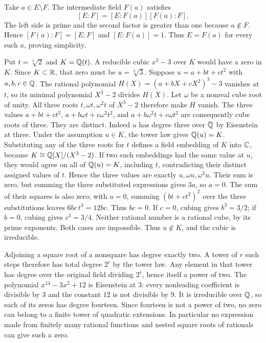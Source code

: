 Take $a\in E\setminus F$. The intermediate field $F(a)$ satisfies
\[[E:F]=[E:F(a)][F(a):F].\]
The left side is prime and the second factor is greater than one because $a\notin F$. Hence $[F(a):F]=[E:F]$ and $[E:F(a)]=1$. Thus $E=F(a)$ for every such $a$, proving simplicity.

Put $t=\sqrt[3]2$ and $K=\mathbb{Q}(t)$. A reducible cubic $x^3-3$ over $K$ would have a zero in $K$. Since $K\subset\mathbb{R}$, that zero must be $u=\sqrt[3]3$.
Suppose $u=a+bt+ct^2$ with $a,b,c\in\mathbb{Q}$. The rational polynomial $H(X)=(a+bX+cX^2)^3-3$ vanishes at $t$, so its minimal polynomial $X^3-2$ divides $H(X)$. Let $\omega$ be a nonreal cube root of unity. All three roots $t,\omega t,\omega^2t$ of $X^3-2$ therefore make $H$ vanish. The three values $a+bt+ct^2$, $a+b\omega t+c\omega^2t^2$, and $a+b\omega^2t+c\omega t^2$ are consequently cube roots of three.
They are distinct. Indeed $u$ has degree three over $\mathbb{Q}$ by Eisenstein at three. Under the assumption $u\in K$, the tower law gives $\mathbb{Q}(u)=K$. Substituting any of the three roots for $t$ defines a field embedding of $K$ into $\mathbb{C}$, because $K\cong\mathbb{Q}[X]/(X^3-2)$. If two such embeddings had the same value at $u$, they would agree on all of $\mathbb{Q}(u)=K$, including $t$, contradicting their distinct assigned values of $t$. Hence the three values are exactly $u,\omega u,\omega^2u$.
Their sum is zero, but summing the three substituted expressions gives $3a$, so $a=0$. The sum of their squares is also zero; with $a=0$, summing $(bt+ct^2)^2$ over the three substitutions leaves $6bc\,t^3=12bc$. Thus $bc=0$.
If $c=0$, cubing gives $b^3=3/2$; if $b=0$, cubing gives $c^3=3/4$. Neither rational number is a rational cube, by its prime exponents. Both cases are impossible. Thus $u\notin K$, and the cubic is irreducible.

Adjoining a square root of a nonsquare has degree exactly two. A tower of $r$ such steps therefore has total degree $2^r$ by the tower law. Any element in that tower has degree over the original field dividing $2^r$, hence itself a power of two.
The polynomial $x^{14}-3x^2+12$ is Eisenstein at $3$: every nonleading coefficient is divisible by $3$ and the constant $12$ is not divisible by $9$. It is irreducible over $\mathbb{Q}$, so each of its zeros has degree fourteen. Since fourteen is not a power of two, no zero can belong to a finite tower of quadratic extensions. In particular no expression made from finitely many rational functions and nested square roots of rationals can give such a zero.

